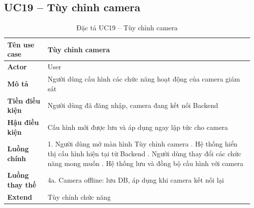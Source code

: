 \subsection*{UC19 -- Tùy chỉnh camera}
\begin{table}[H]
    \captionsetup{justification=raggedright, singlelinecheck=false}
    \caption{Đặc tả UC19 -- Tùy chỉnh camera}
\centering
\begin{tabular}{|p{3.5cm}|p{10cm}|}
\hline
\textbf{Tên use case} & Tùy chỉnh camera \\
\hline
\textbf{Actor} & User \\
\hline
\textbf{Mô tả} & Người dùng cấu hình các chức năng hoạt
  động của camera giám sát \\
\hline
\textbf{Tiền điều kiện} & Người dùng đã đăng nhập, camera
  đang kết nối Backend \\
\hline
\textbf{Hậu điều kiện} & Cấu hình mới được lưu và áp dụng
  ngay lập tức cho camera \\
\hline
\textbf{Luồng chính} &
  1. Người dùng mở màn hình Tùy chỉnh camera \newline
  2. Hệ thống hiển thị cấu hình hiện tại từ Backend \newline
  3. Người dùng thay đổi các chức năng mong muốn \newline
  4. Hệ thống lưu và đồng bộ cấu hình với camera \\
\hline
\textbf{Luồng thay thế} &
  4a. Camera offline: lưu DB, áp dụng khi camera
  kết nối lại \\
\hline
\textbf{Extend} & Tùy chỉnh chức năng \\
\hline
\end{tabular}

\end{table}

